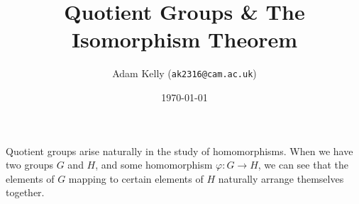 \documentclass[11pt]{amsart}
\title{Quotient Groups \& The Isomorphism Theorem}
\author{Adam Kelly (\texttt{ak2316@cam.ac.uk})}
\date{\today}
\begin{document}
\maketitle

Quotient groups arise naturally in the study of homomorphisms. When we have two groups $G$ and $H$, and some homomorphism $\varphi: G \rightarrow H$, we can see that the elements of $G$ mapping to certain elements of $H$ naturally arrange themselves together.

\begin{center}
	



	\begin{tikzpicture}[x=0.75pt,y=0.75pt,yscale=-1,xscale=1]
	

\end{tikzpicture}
\end{center}
\end{document}
